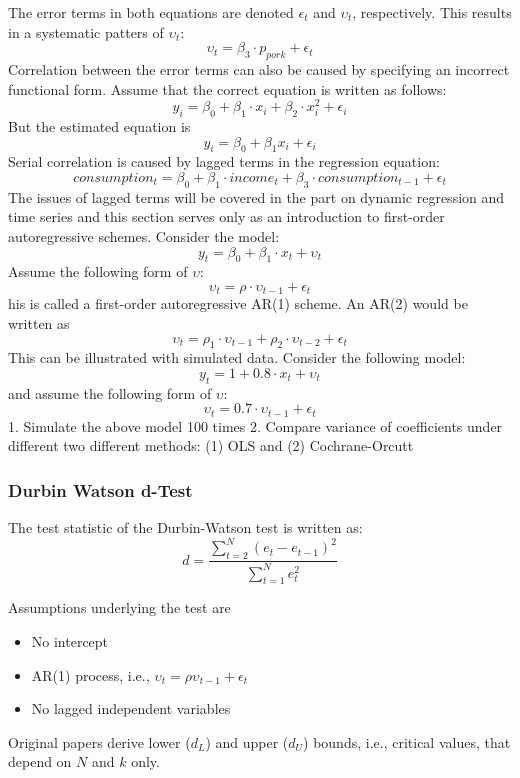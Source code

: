 \documentclass[
]{article}
\providecommand{\tightlist}{%
  \setlength{\itemsep}{0pt}\setlength{\parskip}{0pt}}
\begin{document}
The error terms in both equations are denoted \(\epsilon_t\) and \(\upsilon_t\), respectively. This results in a systematic patters of \(\upsilon_t\):
\[\upsilon_t= \beta_3 \cdot p_{pork}+\epsilon_t\]
Correlation between the error terms can also be caused by specifying an incorrect functional form. Assume that the correct equation is written as follows:
\[y_i = \beta_0 +\beta_1 \cdot x_i +\beta_2 \cdot x_i^2 +\epsilon_i\]
But the estimated equation is
\[y_i = \beta_0 +\beta_1 x_i +\epsilon_i\]
Serial correlation is caused by lagged terms in the regression equation:
\[consumption_t = \beta_0 + \beta_1 \cdot income_t+\beta_3 \cdot consumption_{t-1}+\epsilon_t\]
The issues of lagged terms will be covered in the part on dynamic regression and time series and this section serves only as an introduction to first-order autoregressive schemes. Consider the model:
\[y_t=\beta_0+\beta_1 \cdot x_t + \upsilon_t\]
Assume the following form of \(\upsilon\):
\[\upsilon_t = \rho \cdot  \upsilon_{t-1} + \epsilon_t\]
his is called a first-order autoregressive AR(1) scheme. An AR(2) would be written as
\[\upsilon_t = \rho_1 \cdot \upsilon_{t-1} + \rho_2 \cdot \upsilon_{t-2} + \epsilon_t\]
This can be illustrated with simulated data. Consider the following model:
\[y_t=1+0.8 \cdot x_t + \upsilon_t\]
and assume the following form of \(\upsilon\):
\[\upsilon_t = 0.7 \cdot \upsilon_{t-1} + \epsilon_t\]
1. Simulate the above model 100 times
2. Compare variance of coefficients under different two different methods: (1) OLS and (2) Cochrane-Orcutt

\hypertarget{durbin-watson-d-test}{%
\subsubsection{Durbin Watson d-Test}\label{durbin-watson-d-test}}

The test statistic of the Durbin-Watson test is written as:
\[d=\frac{\sum_{t=2}^N (e_t-e_{t-1})^2}{\sum_{t=1}^N e_t^2}\]

Assumptions underlying the test are

\begin{itemize}
\tightlist
\item
  No intercept
\item
  AR(1) process, i.e., \(\upsilon_t = \rho \upsilon_{t-1} + \epsilon_t\)
\item
  No lagged independent variables
\end{itemize}

Original papers derive lower (\(d_L\)) and upper (\(d_U\)) bounds, i.e., critical values, that depend on \(N\) and \(k\) only.
\end{document}
